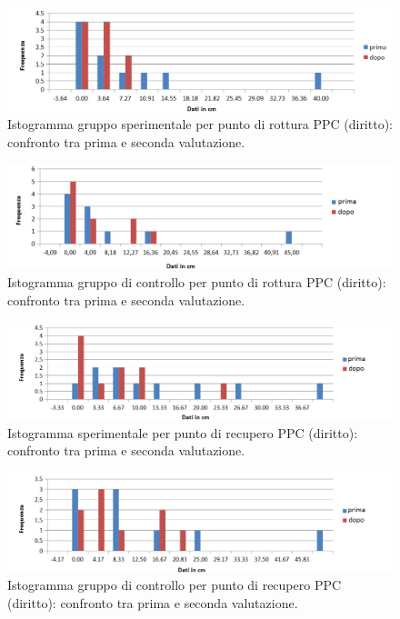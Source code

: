  \begin{figure}[h!]
	\centering
	\includegraphics[scale=0.37]{source/grafici/PPC_DIRITTO_DEFINITIVO_sperimentale.png}
	\caption[Istogramma gruppo sperimentale per punto di rottura PPC (diritto)]{Istogramma gruppo sperimentale per punto di rottura PPC (diritto): confronto tra prima e seconda valutazione.}
	\label{fig:issuexample}
\end{figure}
 \begin{figure}[h!]
	\centering
	\includegraphics[scale=0.37]{source/grafici/PPC_DIRITTO_DEFINITIVO_GRUPPO_CONTROLLO.png}
	\caption[Istogramma gruppo di controllo per punto di rottura PPC (diritto)]{Istogramma gruppo di controllo per punto di rottura PPC (diritto): confronto tra prima e seconda valutazione.}
	\label{fig:issuexample}
\end{figure}
 \begin{figure}[h!]
	\centering
	\includegraphics[scale=0.37]{source/grafici/Recupero_PPC_diritto_Trattati.png}
	\caption[Istogramma  sperimentale per punto di recupero PPC (diritto)]{Istogramma  sperimentale per punto di recupero PPC (diritto): confronto tra prima e seconda valutazione.}
	\label{fig:issuexample}
\end{figure}
 \begin{figure}[h!]
	\centering
	\includegraphics[scale=0.37]{source/grafici/Recupero_PPC_diritto_Non_Trattati.png}
	\caption[Istogramma gruppo di controllo per punto di recupero PPC (diritto)]{Istogramma gruppo di controllo per punto di recupero PPC (diritto): confronto tra prima e seconda valutazione.}
	\label{fig:issuexample}
\end{figure}
\\\ \\\

